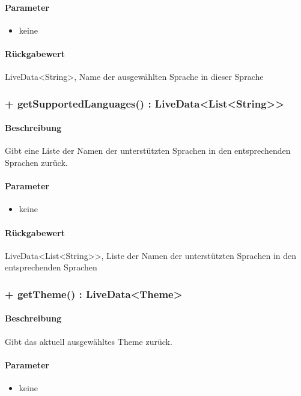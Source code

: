 \paragraph*{Parameter}
\begin{itemize}
    \item keine
\end{itemize}
\paragraph*{Rückgabewert}
LiveData<String>, Name der ausgewählten Sprache in dieser Sprache

\subsubsection{+ getSupportedLanguages() : LiveData<List<String>>}%
\paragraph*{Beschreibung}
Gibt eine Liste der Namen der unterstützten Sprachen in den entsprechenden Sprachen zurück.
\paragraph*{Parameter}
\begin{itemize}
    \item keine
\end{itemize}
\paragraph*{Rückgabewert}
LiveData<List<String>>, Liste der Namen der unterstützten Sprachen in den entsprechenden Sprachen

\subsubsection{+ getTheme() : LiveData<Theme>}%
\paragraph*{Beschreibung}
Gibt das aktuell ausgewähltes Theme zurück.
\paragraph*{Parameter}
\begin{itemize}
    \item keine
\end{itemize}
